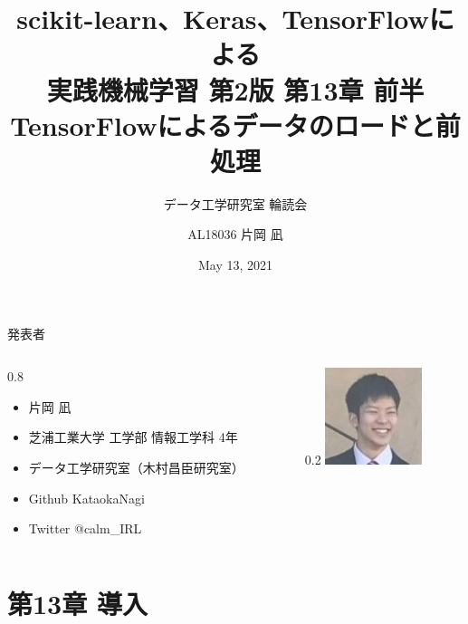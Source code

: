 \documentclass[aspectratio=169, dvipdfmx, 14pt, xcolor={svgnames,dvipsnames}, t]{beamer}
\title[13章 前半 TFによるデータのロードと前処理]{scikit-learn、Keras、TensorFlowによる\\実践機械学習 第2版 第13章 前半\\
TensorFlowによるデータのロードと前処理}
\subtitle{データ工学研究室 輪読会}
\author[片岡 凪]{AL18036 片岡 凪}
\institute[データ工学研究室 B4]{芝浦工業大学 工学部 情報工学科 4年}
\date{May 13, 2021}
\newlength{\mytotalwidth}
\newlength{\mycolumnwidth}
\begin{document}

\maketitle


\begin{frame}{発表者}
  \begin{columns}[totalwidth=\mytotalwidth]
    \begin{column}[t]{0.8\mycolumnwidth}
      \begin{itemize}
        \item 片岡 凪
        \item 芝浦工業大学 工学部 情報工学科 4年
        \item データ工学研究室（木村昌臣研究室）
        \item Github  KataokaNagi
        \item Twitter @calm\_IRL
      \end{itemize}
    \end{column}
    \begin{column}[T]{0.2\mycolumnwidth}
      \centering
      \includegraphics[width=80pt]{img/icon.jpg}
    \end{column}
  \end{columns}
\end{frame}




\hypertarget{ux7b2c13ux7ae0-ux5c0eux5165}{%
  \section{第13章 導入}\label{ux7b2c13ux7ae0-ux5c0eux5165}}

\end{document}
